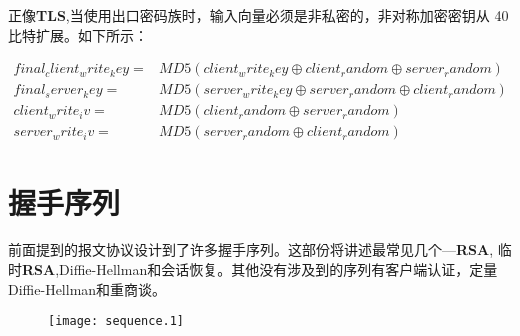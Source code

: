 \documentclass[11pt,dvips]{article}
\newcommand{\bfs}[1]{{\bf{#1}}}
\begin{document}
正像\bfs{TLS},当使用出口密码族时，输入向量必须是非私密的，非对称加密密钥从
40比特扩展。如下所示：

\begin{align*}
        final_client_write_key = & MD5(client_write_key \oplus client_random
        \oplus server_random) {} \\
        final_server_key  = & MD5(server_write_key \oplus server_random \oplus
        client_random) {} \\
        client_write_iv = &MD5(client_random \oplus server_random) {} \\
        server_write_iv = & MD5(server_random \oplus client_random)
\end{align*}


\section{握手序列}

前面提到的报文协议设计到了许多握手序列。这部份将讲述最常见几个---\bfs{RSA},
临时\bfs{RSA},Diffie-Hellman和会话恢复。其他没有涉及到的序列有客户端认证，定量Diffie-Hellman和重商谈。\\

%
%
% 
% 
%
%
%
%
%
\begin{figure}[!tbd]
        \begin{center}
        \texttt{[image: sequence.1]}
\end{center}

\end{figure}
\end{document}
